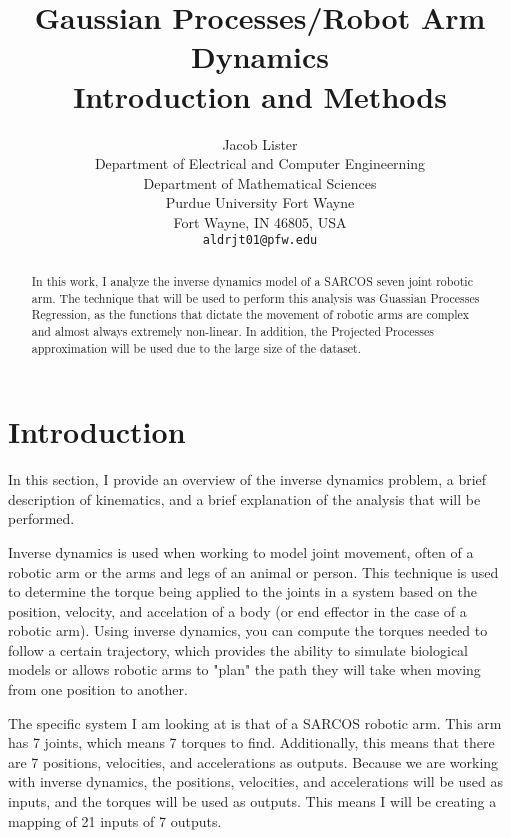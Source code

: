 \documentclass{article}
\title{Gaussian Processes/Robot Arm Dynamics \\ Introduction and Methods}
\author {Jacob Lister                              \\
Department of Electrical and Computer Engineerning \\
Department of Mathematical Sciences                \\
Purdue University Fort Wayne                       \\
Fort Wayne, IN 46805, USA                          \\
\texttt{aldrjt01@pfw.edu}
}
\begin{document}
    \maketitle

    \begin{abstract}
        In this work, I analyze the inverse dynamics model of a SARCOS seven joint robotic arm.
        The technique that will be used to perform this analysis was Guassian Processes Regression,
        as the functions that dictate the movement of robotic arms are complex and almost always
        extremely non-linear. In addition, the Projected Processes approximation will be used due
        to the large size of the dataset.
    \end{abstract}

    \section{Introduction}
    

    In this section, I provide an overview of the inverse dynamics problem, a brief description
    of kinematics, and a brief explanation of the analysis that will be performed.
    
    Inverse dynamics is used when working to model joint movement, often of a robotic arm or
    the arms and legs of an animal or person. This technique is used to determine the torque
    being applied to the joints in a system based on the position, velocity, and accelation of
    a body (or end effector in the case of a robotic arm). Using inverse dynamics, you can
    compute the torques needed to follow a certain trajectory, which provides the ability to
    simulate biological models or allows robotic arms to "plan" the path they will take when
    moving from one position to another.
    
    The specific system I am looking at is that of a SARCOS robotic arm. This arm has 7 joints,
    which means 7 torques to find. Additionally, this means that there are 7 positions, velocities,
    and accelerations as outputs. Because we are working with inverse dynamics, the positions,
    velocities, and accelerations will be used as inputs, and the torques will be used as outputs.
    This means I will be creating a mapping of 21 inputs of 7 outputs.
    
\end{document}
